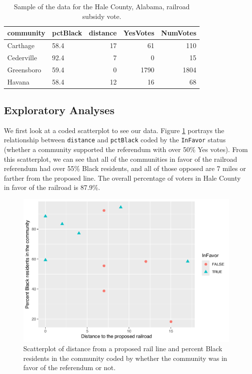 \documentclass[
]{krantz}
\begin{document}
\begin{table}
\centering
\caption{\label{tab:table2chp6}Sample of the data for the Hale County, Alabama, railroad subsidy vote.}
\centering
\begin{tabular}[t]{llrrr}
\toprule
community & pctBlack & distance & YesVotes & NumVotes\\
\midrule
Carthage & 58.4 & 17 & 61 & 110\\
Cederville & 92.4 & 7 & 0 & 15\\
Greensboro & 59.4 & 0 & 1790 & 1804\\
Havana & 58.4 & 12 & 16 & 68\\
\bottomrule
\end{tabular}
\end{table}

\subsection{Exploratory Analyses}\label{exploratory-analyses}

We first look at a coded scatterplot to see our data. Figure \ref{fig:coded} portrays the relationship between \texttt{distance} and \texttt{pctBlack} coded by the \texttt{InFavor} status (whether a community supported the referendum with over 50\% Yes votes). From this scatterplot, we can see that all of the communities in favor of the railroad referendum had over 55\% Black residents, and all of those opposed are 7 miles or farther from the proposed line. The overall percentage of voters in Hale County in favor of the railroad is 87.9\%.

\begin{figure}

{\centering \includegraphics[width=0.6\linewidth]{bookdown-BeyondMLR_files/figure-latex/coded-1} 

}

\caption{ Scatterplot of distance from a proposed rail line and percent Black residents in the community coded by whether the community was in favor of the referendum or not.}\label{fig:coded}
\end{figure}
\end{document}

